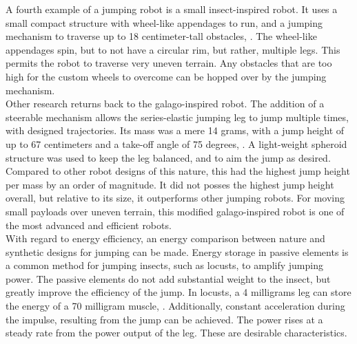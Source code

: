 \indent A fourth example of a jumping robot is a small insect-inspired robot. It uses a small compact structure with wheel-like appendages to run, and a jumping mechanism to traverse up to 18 centimeter-tall obstacles, \cite{lambrecht_small_2005}. The wheel-like appendages spin, but to not have a circular rim, but rather, multiple legs. This permits the robot to traverse very uneven terrain. Any obstacles that are too high for the custom wheels to overcome can be hopped over by the jumping mechanism. \\
\indent Other research returns back to the galago-inspired robot. The addition of a steerable mechanism allows the series-elastic jumping leg to jump multiple times, with designed trajectories. Its mass was a mere 14 grams, with a jump height of up to 67 centimeters and a take-off angle of 75 degrees, \cite{kovac_steerable_2010}. A light-weight spheroid structure was used to keep the leg balanced, and to aim the jump as desired. Compared to other robot designs of this nature, this had the highest jump height per mass by an order of magnitude. It did not posses the highest jump height overall, but relative to its size, it outperforms other jumping robots. For moving small payloads over uneven terrain, this modified galago-inspired robot is one of the most advanced and efficient robots.\\
\indent With regard to energy efficiency, an energy comparison between nature and synthetic designs for jumping can be made. Energy storage in passive elements is a common method for jumping insects, such as locusts, to amplify jumping power. The passive elements do not add substantial weight to the insect, but greatly improve the efficiency of the jump. In locusts, a 4 milligrams leg can store the energy of a 70 milligram muscle, \cite{bennet-clark_energetics_nodate}. Additionally, constant acceleration during the impulse, resulting from the jump can be achieved. The power rises at a steady rate from the power output of the leg. These are desirable characteristics. \\
